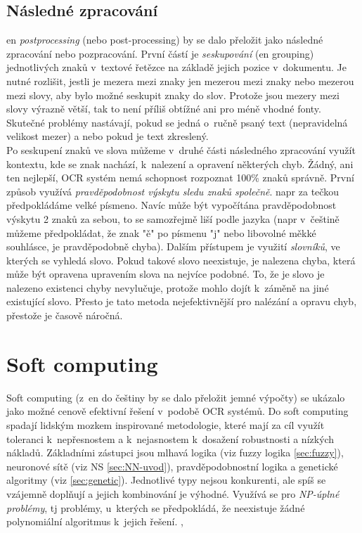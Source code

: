 \documentclass[12pt]{report}			%
\begin{document}
	\subsection{Následné zpracování}
	\label{sec:postproces}
	\Gls{en} \emph{postprocessing} (nebo post-processing) by se dalo přeložit jako následné zpracování nebo pozpracování. První částí je \emph{seskupování} (\gls{en} grouping) jednotlivých znaků v~textové řetězce na základě jejich pozice v~dokumentu. Je nutné rozlišit, jestli je mezera mezi znaky jen mezerou mezi znaky nebo mezerou mezi slovy, aby bylo možné seskupit znaky do slov. Protože jsou mezery mezi slovy výrazně větší, tak to není příliš obtížné ani pro méně vhodné fonty. Skutečné problémy nastávají, pokud se jedná o~ručně psaný text (nepravidelná velikost mezer) a nebo pokud je text zkreslený.\parencite[\gls{s} 20]{eikvil-ocr}\\
	Po seskupení znaků ve slova můžeme v~druhé části následného zpracování využít kontextu, kde se znak nachází, k~nalezení a opravení některých chyb. Žádný, ani ten nejlepší, \gls{OCR} systém nemá schopnost rozpoznat 100\% znaků správně. První způsob využívá \emph{pravděpodobnost výskytu sledu znaků společně}. \Gls{napr} za tečkou předpokládáme velké písmeno. Navíc může být vypočítána pravděpodobnost výskytu 2 znaků za sebou, to se samozřejmě liší podle jazyka (\gls{napr} v~češtině můžeme předpokládat, že znak "ě" po písmenu "j" nebo libovolné měkké souhlásce, je pravděpodobně chyba). Dalším přístupem je využití \emph{slovníků}, ve kterých se vyhledá slovo. Pokud takové slovo neexistuje, je nalezena chyba, která může být opravena upravením slova na nejvíce podobné. To, že je slovo je nalezeno existenci chyby nevylučuje, protože mohlo dojít k~záměně na jiné existující slovo. Přesto je tato metoda nejefektivnější pro nalézání a opravu chyb, přestože je časově náročná. \parencite[\gls{str} 20-21]{eikvil-ocr}
	
	\section{Soft computing}
	\label{sec:soft}
	Soft computing (z~\gls{en} do češtiny by se dalo přeložit jemné výpočty) se ukázalo jako možné cenově efektivní řešení v~podobě \gls{OCR} systémů. Do soft computing spadají lidským mozkem inspirované metodologie, které mají za cíl využít toleranci k~nepřesnostem a k~nejasnostem k~dosažení robustnosti a nízkých nákladů. Základními zástupci jsou mlhavá logika (\gls{viz} fuzzy logika \ref{sec:fuzzy}), neuronové sítě (\gls{viz} \gls{NS} \ref{sec:NN-uvod}), pravděpodobnostní logika a genetické algoritmy (\gls{viz} \ref{sec:genetic}). Jednotlivé typy nejsou konkurenti, ale spíš se vzájemně doplňují a jejich kombinování je výhodné. Využívá se pro \emph{NP-úplné problémy}, \gls{tj} problémy, u~kterých se předpokládá, že neexistuje žádné polynomiální algoritmus k~jejich řešení.  \parencite[\gls{str} 43-45]{eikvil-ocr}, \parencite[\gls{str} 48-49]{soft_fuzzy}
	
\end{document}
